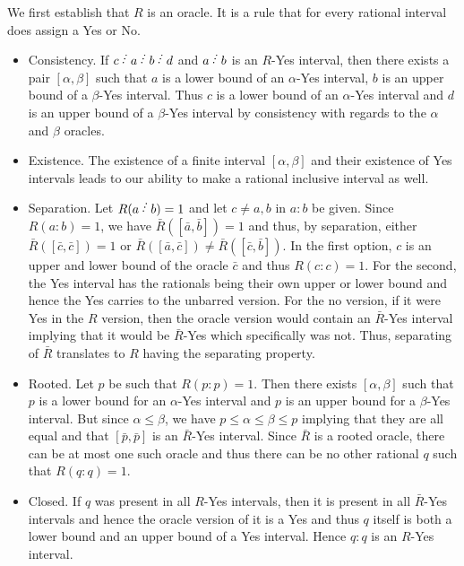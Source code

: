 \documentclass[12pt]{article}
\begin{document}
We first establish that $R$ is an oracle. It is a rule that for every rational interval does assign a Yes or No. 
\begin{itemize}
    \item Consistency. If $c\lte a \lte b \lte d$ and $a \lte b$ is an $R$-Yes interval, then there exists a pair $[\alpha, \beta]$ such that $a$ is a lower bound of an $\alpha$-Yes interval, $b$ is an upper bound of a $\beta$-Yes interval. Thus $c$ is a lower bound of an $\alpha$-Yes interval and $d$ is an upper bound of a $\beta$-Yes interval by consistency with regards to the $\alpha$ and $\beta$ oracles.
    \item Existence. The existence of a finite interval $[\alpha, \beta]$ and their existence of Yes intervals leads to our ability to make a rational inclusive interval as well. 
    \item Separation. Let $R(a\lte b) = 1$ and let $c \neq a, b$ in $a:b$ be given. Since $R(a:b)= 1$, we have $\bar{R}([\bar{a}, \bar{b}]) = 1$ and  thus, by separation, either $\bar{R}([\bar{c}, \bar{c}]) = 1$ or $\bar{R}([\bar{a}, \bar{c}]) \neq \bar{R}([\bar{c}, \bar{b}])$. In the first option, $c$ is an upper and lower bound of the oracle $\bar{c}$ and thus $R(c:c) =1$. For the second, the Yes interval has the rationals being their own upper or lower bound and hence the Yes carries to the unbarred version. For the no version, if it were Yes in the $R$ version, then the oracle version would contain an $\bar{R}$-Yes interval implying that it would be $\bar{R}$-Yes which specifically was not. Thus, separating of $\bar{R}$ translates to $R$ having the separating property. 
    \item Rooted. Let $p$ be such that $R(p:p)=1$. Then there exists $[\alpha, \beta]$ such that $p$ is a lower bound for an $\alpha$-Yes interval and $p$ is an upper bound for a $\beta$-Yes interval. But since $\alpha \leq \beta$, we have $p \leq \alpha \leq \beta \leq p$ implying that they are all equal and that $[\bar{p}, \bar{p}]$ is an $\bar{R}$-Yes interval. Since $\bar{R}$ is a rooted oracle, there can be at most one such oracle and thus there can be no other rational $q$ such that $R(q:q) = 1$.
    \item Closed. If $q$ was present in all $R$-Yes intervals, then it is present in all $\bar{R}$-Yes intervals and hence the oracle version of it is a Yes and thus $q$ itself is both a lower bound and an upper bound of a Yes interval. Hence $q:q$ is an $R$-Yes interval.
\end{itemize}
\end{document}
